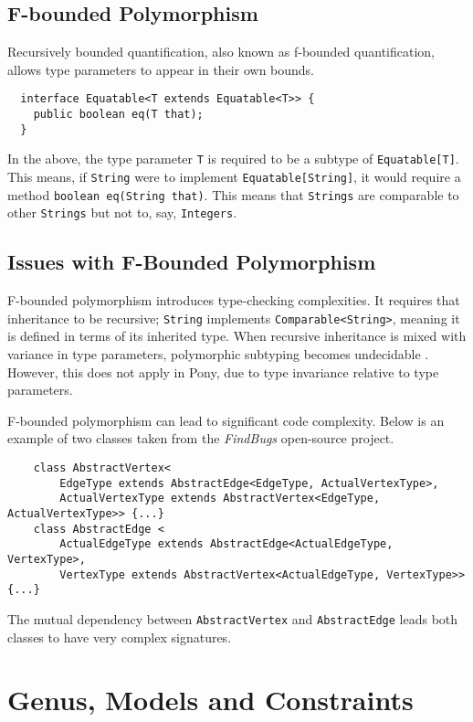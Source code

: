 \subsection{F-bounded Polymorphism}

Recursively bounded quantification, also known as f-bounded quantification, allows type parameters to appear in their own bounds.
\begin{verbatim}
  interface Equatable<T extends Equatable<T>> {
    public boolean eq(T that);
  }
\end{verbatim}
In the above, the type parameter \texttt{T} is required to be a subtype of \texttt{Equatable[T]}. This means, if \texttt{String} were to implement \texttt{Equatable[String]}, it would require a method \texttt{boolean eq(String that)}. This means that \texttt{Strings} are comparable to other \texttt{Strings} but not to, say, \texttt{Integers}.

\subsection{Issues with F-Bounded Polymorphism}

F-bounded polymorphism introduces type-checking complexities. It requires that inheritance to be recursive; \texttt{String} implements \texttt{Comparable<String>}, meaning it is defined in terms of its inherited type. When recursive inheritance is mixed with variance in type parameters, polymorphic subtyping becomes undecidable \cite{Kennedy2008}. However, this does not apply in Pony, due to type invariance relative to type parameters. 

F-bounded polymorphism can lead to significant code complexity. Below is an example of two classes taken from the \textit{FindBugs} \cite{FindBugs} open-source project.
\begin{verbatim}
    class AbstractVertex<
        EdgeType extends AbstractEdge<EdgeType, ActualVertexType>, 
        ActualVertexType extends AbstractVertex<EdgeType, ActualVertexType>> {...}
    class AbstractEdge <
        ActualEdgeType extends AbstractEdge<ActualEdgeType, VertexType>, 
        VertexType extends AbstractVertex<ActualEdgeType, VertexType>> {...}
\end{verbatim}
The mutual dependency between \texttt{AbstractVertex} and \texttt{AbstractEdge} leads both classes to have very complex signatures.

\section{Genus, Models and Constraints} \label{sec:genus-bg}

